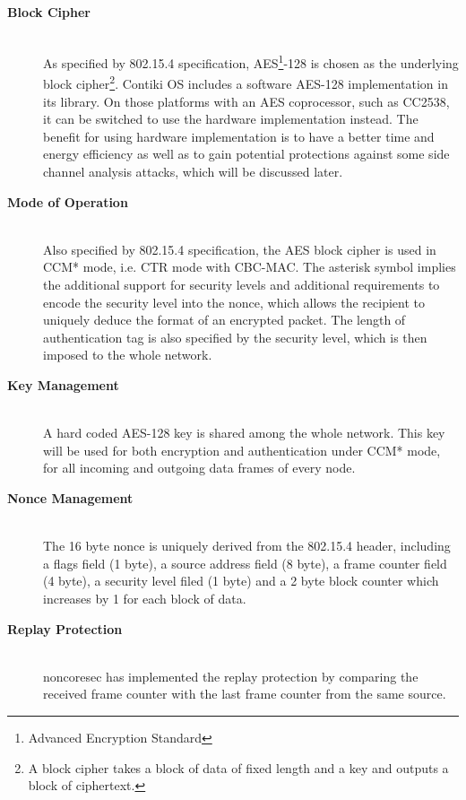 \begin{description}
\item[\textbf{Block Cipher}] \hfill \\
As specified by 802.15.4 specification, AES\footnote{Advanced Encryption Standard\cite{AES}}-128 is chosen as the underlying block cipher\footnote{A block cipher takes a block of data of fixed length and a key and outputs a block of ciphertext.}. Contiki OS includes a software AES-128 implementation in its library. On those platforms with an AES coprocessor, such as CC2538, it can be switched to use the hardware implementation instead. The benefit for using hardware implementation is to have a better time and energy efficiency as well as to gain potential protections against some side channel analysis attacks\cite{DPA1}\cite{DPA2}, which will be discussed later.

\item[\textbf{Mode of Operation}] \hfill \\
Also specified by 802.15.4 specification, the AES block cipher is used in CCM* mode, i.e. CTR mode with CBC-MAC. The asterisk symbol implies the additional support for security levels and additional requirements to encode the security level into the nonce, which allows the recipient to uniquely deduce the format of an encrypted packet. The length of authentication tag is also specified by the security level, which is then imposed to the whole network.

\item[\textbf{Key Management}] \hfill \\
 A hard coded AES-128 key is shared among the whole network. This key will be used for both encryption and authentication under CCM* mode, for all incoming and outgoing data frames of every node.
 
 \item[\textbf{Nonce Management}] \hfill \\
 The 16 byte nonce is uniquely derived from the 802.15.4 header, including a flags field (1 byte), a source address field (8 byte), a frame counter field (4 byte), a security level filed (1 byte) and a 2 byte block counter which increases by 1 for each block of data.
 
\item[\textbf{Replay Protection}] \hfill \\
noncoresec has implemented the replay protection by comparing the received frame counter with the last frame counter from the same source.
\end{description}

